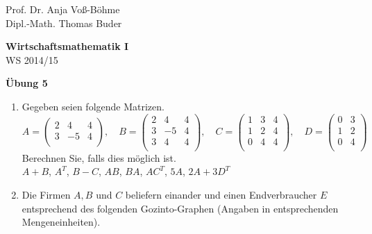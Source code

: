 \documentclass[12pt,a4paper]{scrreprt}
\begin{document}
 
\begin{flushleft}
Prof. Dr.  Anja Voß-Böhme \\
Dipl.-Math. Thomas Buder
\end{flushleft}

\begin{center}{\large\bf Wirtschaftsmathematik I} \\ WS 2014/15 \end{center}

\begin{center}{\large\bf Übung 5 } 
\end{center}


\bigskip
\begin{enumerate}
\item Gegeben seien folgende Matrizen. 
\[A=\begin{pmatrix}
2 & 4 & 4\\
3 & -5 & 4\\

\end{pmatrix}, \quad B=\begin{pmatrix}
2 & 4 & 4\\
3 & -5 & 4\\
3 & 4 & 4\\
\end{pmatrix}, \quad C=\begin{pmatrix}
1 & 3 & 4\\
1 & 2 & 4\\
0 & 4 & 4\\
\end{pmatrix},\quad D=\begin{pmatrix}
0 & 3 \\
1 & 2 \\
0 & 4 \\
\end{pmatrix}\]
Berechnen Sie, falls dies möglich ist. \\

 $A + B$, \quad $A^T$, \quad $B - C$, \quad $AB$, \quad $BA$, \quad $AC^T$, \quad $5A$, \quad $2A+3D^T$



\item Die Firmen $A,B$ und $C$ beliefern einander und einen Endverbraucher $E$ entsprechend des folgenden
Gozinto-Graphen (Angaben in entsprechenden Mengeneinheiten). 


\end{enumerate}
\end{document}
